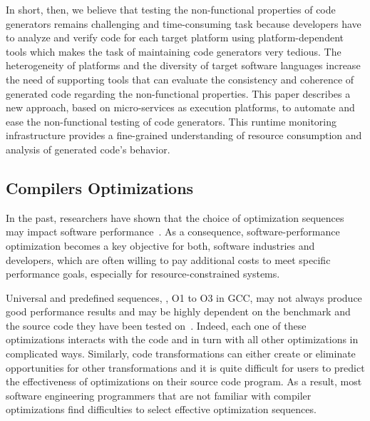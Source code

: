 In short, then, we believe that testing the non-functional properties of code generators remains challenging and time-consuming task because developers have to analyze and verify code for each target platform using platform-dependent tools which makes the task of maintaining code generators very tedious. The heterogeneity of platforms and the diversity of target software languages increase the need of supporting tools that can evaluate the consistency and coherence of generated code regarding the non-functional properties. This paper describes a new approach, based on micro-services as execution platforms, to automate and ease the non-functional testing of code generators. This runtime monitoring infrastructure provides a fine-grained understanding of resource consumption and analysis of generated code's behavior.



 




\iffalse 
//footprint
//It is also possible to automatically generate test suites for software artfacts 
//model coverage
//System resources and architecture of each execution platform might vary 
//talk about platform specific profilers
//heterogeneous execution platforms
//the need of system level abstraction/virtualization to handle heterogeneity
//ease the monitoring process 
//add figure of SOTA 
\fi




\cleardoublepage
\iffalse 
\subsection{Compilers Optimizations}
In the past, researchers have shown that the choice of optimization sequences may impact software performance~\cite{almagor2004finding,chen2012deconstructing}. 
As a consequence, software-performance optimization becomes a key objective for both, software industries and developers, which are often willing to pay additional costs to meet specific performance goals, especially for resource-constrained systems.

Universal and predefined sequences, \eg, O1 to O3 in GCC, may not always produce good performance results and may be highly dependent on the benchmark and the source code they have been tested on~\cite{almagor2004finding,hoste2008cole}.
Indeed, each one of these optimizations interacts with the code and in turn with all other optimizations in complicated ways. Similarly, code transformations can either create or eliminate opportunities for other transformations and it is quite difficult for users to predict the effectiveness of optimizations on their source code program.
As a result, most software engineering programmers that are not familiar with compiler optimizations find difficulties to select effective optimization sequences.

